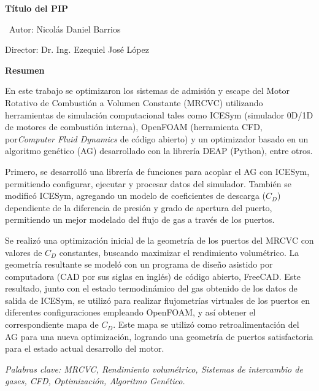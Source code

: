 \documentclass[oneside,a4paper,spanish,links,11pt]{book}
\begin{document}

\newpage
\thispagestyle{plain}

\begin{center}
\large{\textbf{{Título del PIP}}}\\
\end{center}

\normalsize
\
 \hfill Autor: Nicolás Daniel Barrios

\hfill Director: Dr. Ing. Ezequiel José López




\textbf{Resumen}

En este trabajo se optimizaron los sistemas de admisión y escape del Motor
Rotativo de Combustión a Volumen Constante (MRCVC) utilizando herramientas de
simulación computacional tales como ICESym (simulador 0D/1D de motores de
combustión interna), OpenFOAM (herramienta CFD, por\emph{Computer Fluid
Dynamics} de código abierto) y un optimizador basado en un algoritmo genético
(AG) desarrollado con la librería DEAP (Python), entre otros.

Primero, se desarrolló una librería de funciones para acoplar el AG con ICESym,
permitiendo configurar, ejecutar y procesar datos del simulador.
%
También se modificó ICESym, agregando un modelo de coeficientes de descarga
($C_{D}$) dependiente de la diferencia de presión y grado de apertura del
puerto, permitiendo un mejor modelado del flujo de gas a través de los puertos.

Se realizó una optimización inicial de la geometría de los puertos del MRCVC con
valores de $C_{D}$ constantes, buscando maximizar el rendimiento volumétrico.
%
La geometría resultante se modeló con un programa de diseño asistido por
computadora (CAD por sus siglas en inglés) de código abierto, FreeCAD.
%
Este resultado, junto con el estado termodinámico del gas obtenido de los datos
de salida de ICESym, se utilizó para realizar flujometrías virtuales de los
puertos en diferentes configuraciones empleando OpenFOAM, y así obtener el
correspondiente mapa de $C_{D}$.
%
Este mapa se utilizó como retroalimentación del AG para una nueva optimización,
logrando una geometría de puertos satisfactoria para el estado actual desarrollo
del motor.

\noindent 

\textit{Palabras clave: MRCVC, Rendimiento volumétrico, Sistemas de intercambio
de gases, CFD, Optimización, Algoritmo Genético.}
\end{document}
